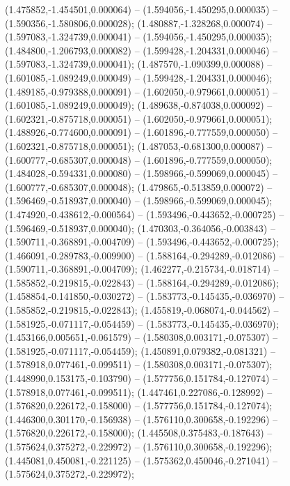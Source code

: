  (1.475852,-1.454501,0.000064) -- (1.594056,-1.450295,0.000035) -- (1.590356,-1.580806,0.000028);
 (1.480887,-1.328268,0.000074) -- (1.597083,-1.324739,0.000041) -- (1.594056,-1.450295,0.000035);
 (1.484800,-1.206793,0.000082) -- (1.599428,-1.204331,0.000046) -- (1.597083,-1.324739,0.000041);
 (1.487570,-1.090399,0.000088) -- (1.601085,-1.089249,0.000049) -- (1.599428,-1.204331,0.000046);
 (1.489185,-0.979388,0.000091) -- (1.602050,-0.979661,0.000051) -- (1.601085,-1.089249,0.000049);
 (1.489638,-0.874038,0.000092) -- (1.602321,-0.875718,0.000051) -- (1.602050,-0.979661,0.000051);
 (1.488926,-0.774600,0.000091) -- (1.601896,-0.777559,0.000050) -- (1.602321,-0.875718,0.000051);
 (1.487053,-0.681300,0.000087) -- (1.600777,-0.685307,0.000048) -- (1.601896,-0.777559,0.000050);
 (1.484028,-0.594331,0.000080) -- (1.598966,-0.599069,0.000045) -- (1.600777,-0.685307,0.000048);
 (1.479865,-0.513859,0.000072) -- (1.596469,-0.518937,0.000040) -- (1.598966,-0.599069,0.000045);
 (1.474920,-0.438612,-0.000564) -- (1.593496,-0.443652,-0.000725) -- (1.596469,-0.518937,0.000040);
 (1.470303,-0.364056,-0.003843) -- (1.590711,-0.368891,-0.004709) -- (1.593496,-0.443652,-0.000725);
 (1.466091,-0.289783,-0.009900) -- (1.588164,-0.294289,-0.012086) -- (1.590711,-0.368891,-0.004709);
 (1.462277,-0.215734,-0.018714) -- (1.585852,-0.219815,-0.022843) -- (1.588164,-0.294289,-0.012086);
 (1.458854,-0.141850,-0.030272) -- (1.583773,-0.145435,-0.036970) -- (1.585852,-0.219815,-0.022843);
 (1.455819,-0.068074,-0.044562) -- (1.581925,-0.071117,-0.054459) -- (1.583773,-0.145435,-0.036970);
 (1.453166,0.005651,-0.061579) -- (1.580308,0.003171,-0.075307) -- (1.581925,-0.071117,-0.054459);
 (1.450891,0.079382,-0.081321) -- (1.578918,0.077461,-0.099511) -- (1.580308,0.003171,-0.075307);
 (1.448990,0.153175,-0.103790) -- (1.577756,0.151784,-0.127074) -- (1.578918,0.077461,-0.099511);
 (1.447461,0.227086,-0.128992) -- (1.576820,0.226172,-0.158000) -- (1.577756,0.151784,-0.127074);
 (1.446300,0.301170,-0.156938) -- (1.576110,0.300658,-0.192296) -- (1.576820,0.226172,-0.158000);
 (1.445508,0.375483,-0.187643) -- (1.575624,0.375272,-0.229972) -- (1.576110,0.300658,-0.192296);
 (1.445081,0.450081,-0.221125) -- (1.575362,0.450046,-0.271041) -- (1.575624,0.375272,-0.229972);
